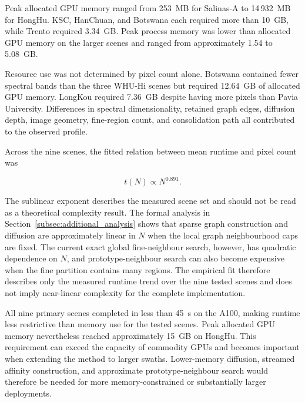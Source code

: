 \documentclass[10pt,a4paper,fleqn]{article}
\begin{document}
Peak allocated GPU memory ranged from 253~MB for Salinas-A to 14\,932~MB
for HongHu. KSC, HanChuan, and Botswana each required more than 10~GB, while
Trento required 3.34~GB. Peak process memory was lower than allocated GPU
memory on the larger scenes and ranged from approximately 1.54 to 5.08~GB.

Resource use was not determined by pixel count alone. Botswana contained fewer
spectral bands than the three WHU-Hi scenes but required 12.64~GB of allocated
GPU memory. LongKou required 7.36~GB despite having more pixels than Pavia
University. Differences in spectral dimensionality, retained graph edges,
diffusion depth, image geometry, fine-region count, and consolidation path all
contributed to the observed profile.

Across the nine scenes, the fitted relation between mean runtime and pixel
count was

\begin{equation}
t(N)\propto N^{0.891}.
\label{eq:empirical_runtime_scaling}
\end{equation}

The sublinear exponent describes the measured scene set and should not be read
as a theoretical complexity result. The formal analysis in
Section~\ref{subsec:additional_analysis} shows that sparse graph construction
and diffusion are approximately linear in \(N\) when the local graph
neighbourhood caps are fixed. The current exact global fine-neighbour search,
however, has quadratic dependence on \(N\), and prototype-neighbour search can
also become expensive when the fine partition contains many regions. The
empirical fit therefore describes only the measured runtime trend over the
nine tested scenes and does not imply near-linear complexity for the complete
implementation.

All nine primary scenes completed in less than 45~s on the A100, making runtime
less restrictive than memory use for the tested scenes. Peak allocated GPU
memory nevertheless reached approximately 15~GB on HongHu. This requirement
can exceed the capacity of commodity GPUs and becomes important when extending
the method to larger swaths. Lower-memory diffusion, streamed affinity
construction, and approximate prototype-neighbour search would therefore be
needed for more memory-constrained or substantially larger deployments.

\FloatBarrier
\end{document}
